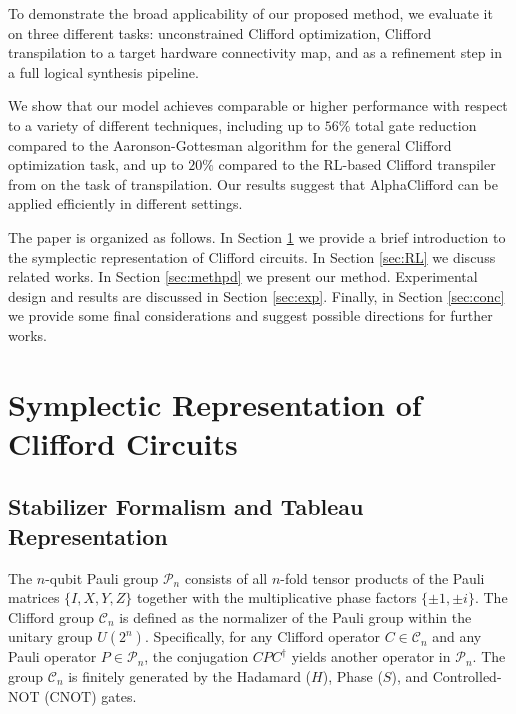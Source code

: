 \documentclass[conference]{IEEEtran}
\newcommand{\CNOT}{\ensuremath{\text{CNOT}}\xspace}
\begin{document}
To demonstrate the broad applicability of our proposed method, we evaluate it on three different tasks: unconstrained Clifford optimization, Clifford transpilation to a target hardware connectivity map, and as a refinement step in a full logical synthesis pipeline.

We show that our model achieves comparable or higher performance with respect to a variety of different techniques, including up to $56\%$ total gate reduction compared to the Aaronson-Gottesman algorithm \cite{AG_for_clifford} for the general Clifford optimization task, and up to $20\%$ compared to the RL-based Clifford transpiler from \cite{KremerIBM} on the task of transpilation. Our results suggest that AlphaClifford can be applied efficiently in different settings.

The paper is organized as follows. In Section \ref{sec:background} we provide a brief introduction to the symplectic representation of Clifford circuits. In Section \ref{sec:RL} we discuss related works. In Section \ref{sec:methpd} we present our method. Experimental design and results are discussed in Section \ref{sec:exp}. Finally, in Section \ref{sec:conc} we provide some final considerations and suggest possible directions for further works.

\section{Symplectic Representation of Clifford Circuits}
\label{sec:background}
\subsection{Stabilizer Formalism and Tableau Representation}
The $n$-qubit Pauli group $\mathcal{P}_n$ consists of all $n$-fold tensor products of the Pauli matrices $\{I, X, Y, Z\}$ together with the multiplicative phase factors $\{\pm 1, \pm i\}$. The Clifford group $\mathcal{C}_n$ is defined as the normalizer of the Pauli group within the unitary group $U(2^n)$. Specifically, for any Clifford operator $C \in \mathcal{C}_n$ and any Pauli operator $P \in \mathcal{P}_n$, the conjugation $CPC^\dagger$ yields another operator in $\mathcal{P}_n$. The group $\mathcal{C}_n$ is finitely generated by the Hadamard ($H$), Phase ($S$), and Controlled-NOT (\CNOT) gates.
\end{document}
